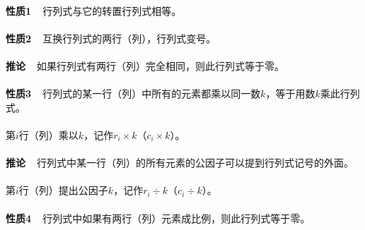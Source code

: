 \paragraph{}
\textbf{性质1~~}行列式与它的转置行列式相等。

\paragraph{}
\hypertarget{行列式性质2}{}
\textbf{性质2~~}互换行列式的两行（列），行列式变号。

\paragraph{}
\hypertarget{行列式性质2的推论}{}
\textbf{推论~~}如果行列式有两行（列）完全相同，则此行列式等于零。

\paragraph{}
\textbf{性质3~~}行列式的某一行（列）中所有的元素都乘以同一数$k$，等于用数$k$乘此行列式。

\paragraph{}
第$i$行（列）乘以$k$，记作$r_i \times k$（$c_i \times k$）。

\paragraph{}
\textbf{推论~~}行列式中某一行（列）的所有元素的公因子可以提到行列式记号的外面。

\paragraph{}
第$i$行（列）提出公因子$k$，记作$r_i \div k$（$c_i \div k$）。

\paragraph{}
\textbf{性质4~~}行列式中如果有两行（列）元素成比例，则此行列式等于零。

